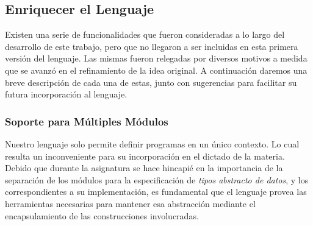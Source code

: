\iffalse
Otra opción, es rediseñar los chequeos estáticos actuales para realizar más de una recorrida al \textit{árbol de sintaxis abstracta}.
La idea es que en una primera pasada, se puedan analizar todos los prototipos de las definiciones de tipo, y las declaraciones de funciones y procedimientos del programa.
Una vez finalizado este análisis, se deberá realizar una segunda pasada donde esta vez se deberán verificar los cuerpos de las construcciones anteriormente mencionadas.
De esta manera, se pueden acumular la totalidad de errores encontrados en una de estas fases, antes de abortar el análisis del programa con un mensaje de error.
Comparada con la técnica anterior, la opción actual resulta mucha más compleja y necesita modificar gran parte de la implementación.
A pesar de esto, la misma aprovecha la idea que los prototipos son válidos de forma mutuamente independiente entre ellos, al igual que como ocurre con sus respectivos cuerpos.
Otra ventaja de la técnica actual sobre la opción anterior, es que la misma permitiría invocar funciones y procedimientos sin importar el lugar espacial donde hayan sido declaradas.
Incluso se admitiría la posibilidad de definir de forma mutua las construcciones previamente mencionadas.
\fi

\subsection{Enriquecer el Lenguaje}

Existen una serie de funcionalidades que fueron consideradas a lo largo del desarrollo de este trabajo, pero que no llegaron a ser incluidas en esta primera versión del lenguaje.
Las mismas fueron relegadas por diversos motivos a medida que se avanzó en el refinamiento de la idea original.
A continuación daremos una breve descripción de cada una de estas, junto con sugerencias para facilitar su futura incorporación al lenguaje.

\subsubsection{Soporte para Múltiples Módulos}

Nuestro lenguaje solo permite definir programas en un único contexto.
Lo cual resulta un inconveniente para su incorporación en el dictado de la materia.
Debido que durante la asignatura se hace hincapié en la importancia de la separación de los módulos para la especificación de \textit{tipos abstracto de datos}, y los correspondientes a su implementación, es fundamental que el lenguaje provea las herramientas necesarias para mantener esa abstracción mediante el encapsulamiento de las construcciones involucradas.

